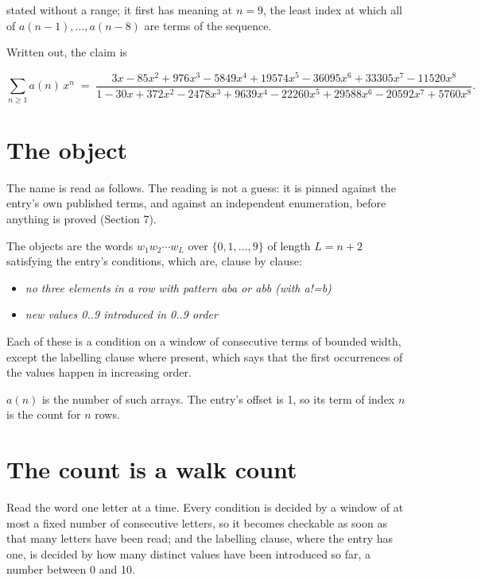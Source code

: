 \documentclass[11pt]{article}
\theoremstyle{definition}
\begin{document}
stated without a range; it first has meaning at $n = 9$, the least index at which all of $a(n-1),\dots,a(n-8)$ are terms of the sequence.

Written out, the claim is

\[\sum_{n \ge 1} a(n)\,x^n \;=\; \frac{3x - 85x^{2} + 976x^{3} - 5849x^{4} + 19574x^{5} - 36095x^{6} + 33305x^{7} - 11520x^{8}}{1 - 30x + 372x^{2} - 2478x^{3} + 9639x^{4} - 22260x^{5} + 29588x^{6} - 20592x^{7} + 5760x^{8}}.\]

\section{The object}

The name is read as follows. The reading is not a guess: it is pinned against the entry's own published terms, and against an independent enumeration, before anything is proved (Section 7).

The objects are the words $w_1 w_2 \cdots w_L$ over $\{0,1,\dots,9\}$ of length $L = n + 2$ satisfying the entry's conditions, which are, clause by clause:

\begin{itemize}

\item {\itshape no three elements in a row with pattern aba or abb (with a!=b)}

\item {\itshape new values 0..9 introduced in 0..9 order}

\end{itemize}

Each of these is a condition on a window of consecutive terms of bounded width, except the labelling clause where present, which says that the first occurrences of the values happen in increasing order.

$a(n)$ is the number of such arrays. The entry's offset is 1, so its term of index $n$ is the count for $n$ rows.

\section{The count is a walk count}

Read the word one letter at a time. Every condition is decided by a window of at most a fixed number of consecutive letters, so it becomes checkable as soon as that many letters have been read; and the labelling clause, where the entry has one, is decided by how many distinct values have been introduced so far, a number between $0$ and 10.
\end{document}

